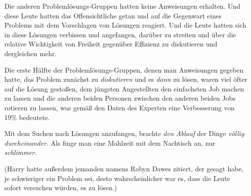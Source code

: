Die anderen Problemlösungs-Gruppen hatten keine Anweisungen erhalten. Und diese Leute hatten das Offensichtliche getan und auf die Gegenwart eines Problems mit dem Vorschlagen von Lösungen reagiert. Und die Leute hatten sich in diese Lösungen verbissen und angefangen, darüber zu streiten und über die relative Wichtigkeit von Freiheit gegenüber Effizienz zu diskutieren und dergleichen mehr.

Die erste Hälfte der Problemlösungs-Gruppen, denen man Anweisungen gegeben hatte, das Problem zunächst zu \emph{diskutieren} und es \emph{dann} zu lösen, waren viel öfter auf die Lösung gestoßen, dem jüngsten Angestellten den einfachsten Job machen zu lassen und die anderen beiden Personen zwischen den anderen beiden Jobs rotieren zu lassen, was gemäß den Daten des Experten eine Verbesserung von 19\% bedeutete.

Mit dem Suchen nach Lösungen anzufangen, brachte \emph{den Ablauf} der Dinge \emph{völlig durcheinander.} Als finge man eine Mahlzeit mit dem Nachtisch an, nur \emph{schlimmer}.

(Harry hatte außerdem jemanden namens Robyn Dawes zitiert, der gesagt habe, je schwieriger ein Problem sei, desto wahrscheinlicher war es, dass die Leute sofort versuchen würden, es zu lösen.)

